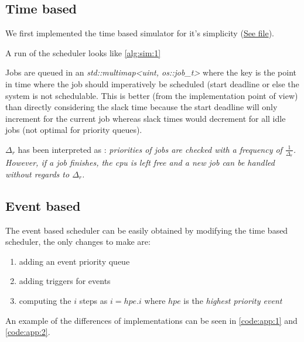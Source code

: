\documentclass[a4paper,12pt]{article}
\begin{document}

\subsection{Time based}

We first implemented the time based simulator for it's simplicity (\href{../h/os/llf_scheduler_time_based.h}{See file}).

A run of the scheduler looks like \ref{alg:sim:1}


Jobs are queued in an \emph{std::multimap<uint, os::job\_t>} where the key is the point in time where the job should imperatively be scheduled (start deadline or else the system is not schedulable.
This is better (from the implementation point of view) than directly considering the slack time because the start deadline will only increment for the current job whereas slack times would decrement for all idle jobs (not optimal for priority queues).

$\Delta_r$ has been interpreted as : \emph{priorities of jobs are checked with a frequency of $\frac{1}{\Delta_r}$. However, if a job finishes, the cpu is left free and a new job can be handled without regards to $\Delta_r$.}
\subsection{Event based}

The event based scheduler can be easily obtained by modifying the time based scheduler, the only changes to make are:
\begin{enumerate}
	\item adding an event priority queue
	\item adding triggers for events
	\item computing the $i$ steps as $i = hpe.i$ where $hpe$ is the \emph{highest priority event}
\end{enumerate}

An example of the differences of implementations can be seen in \ref{code:app:1} and \ref{code:app:2}.
\end{document}
